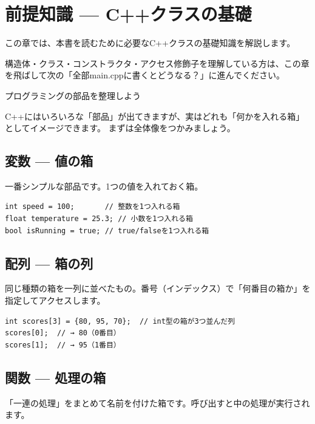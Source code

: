 \section{前提知識 — C++クラスの基礎}
\label{sec:prerequisite}

この章では、本書を読むために必要なC++クラスの基礎知識を解説します。

\begin{notebox}[すでにクラスを理解している方へ]
構造体・クラス・コンストラクタ・アクセス修飾子を理解している方は、この章を飛ばして次の「全部main.cppに書くとどうなる？」に進んでください。
\end{notebox}

\begin{qabox}{プログラミングの部品を整理しよう}

C++にはいろいろな「部品」が出てきますが、実はどれも「何かを入れる箱」としてイメージできます。
まずは全体像をつかみましょう。

\subsection{変数 — 値の箱}

一番シンプルな部品です。1つの値を入れておく箱。

\begin{lstlisting}
int speed = 100;       // 整数を1つ入れる箱
float temperature = 25.3; // 小数を1つ入れる箱
bool isRunning = true; // true/falseを1つ入れる箱
\end{lstlisting}

\subsection{配列 — 箱の列}

同じ種類の箱を一列に並べたもの。番号（インデックス）で「何番目の箱か」を指定してアクセスします。

\begin{lstlisting}
int scores[3] = {80, 95, 70};  // int型の箱が3つ並んだ列
scores[0];  // → 80（0番目）
scores[1];  // → 95（1番目）
\end{lstlisting}

\subsection{関数 — 処理の箱}

「一連の処理」をまとめて名前を付けた箱です。呼び出すと中の処理が実行されます。


\end{qabox}
